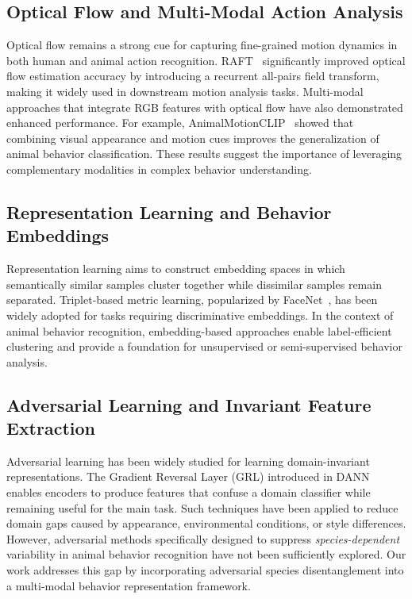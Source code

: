 \documentclass[fleqn,10pt,twocolumn]{AROB}
\begin{document}
\subsection{Optical Flow and Multi-Modal Action Analysis}
Optical flow remains a strong cue for capturing fine-grained motion dynamics in both human and animal action recognition. RAFT~\cite{raft} significantly improved optical flow estimation accuracy by introducing a recurrent all-pairs field transform, making it widely used in downstream motion analysis tasks. Multi-modal approaches that integrate RGB features with optical flow have also demonstrated enhanced performance. For example, AnimalMotionCLIP~\cite{animalmotionclip} showed that combining visual appearance and motion cues improves the generalization of animal behavior classification. These results suggest the importance of leveraging complementary modalities in complex behavior understanding.

\subsection{Representation Learning and Behavior Embeddings}
Representation learning aims to construct embedding spaces in which semantically similar samples cluster together while dissimilar samples remain separated. Triplet-based metric learning, popularized by FaceNet~\cite{facenet}, has been widely adopted for tasks requiring discriminative embeddings. In the context of animal behavior recognition, embedding-based approaches enable label-efficient clustering and provide a foundation for unsupervised or semi-supervised behavior analysis.

\subsection{Adversarial Learning and Invariant Feature Extraction}
Adversarial learning has been widely studied for learning domain-invariant representations. The Gradient Reversal Layer (GRL) introduced in DANN~\cite{ganin2016dann} enables encoders to produce features that confuse a domain classifier while remaining useful for the main task. Such techniques have been applied to reduce domain gaps caused by appearance, environmental conditions, or style differences. However, adversarial methods specifically designed to suppress \emph{species-dependent} variability in animal behavior recognition have not been sufficiently explored.
Our work addresses this gap by incorporating adversarial species disentanglement into a multi-modal behavior representation framework.
\end{document}
